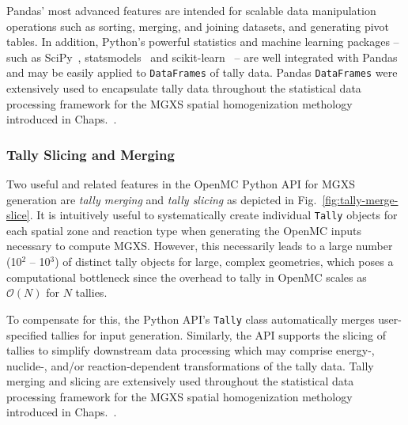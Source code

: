 Pandas' most advanced features are intended for scalable data manipulation operations such as sorting, merging, and joining datasets, and generating pivot tables. In addition, Python's powerful statistics and machine learning packages -- such as SciPy~\cite{jones2011scipy}, statsmodels~\cite{seabold2010statsmodels} and scikit-learn~\cite{pedregosa2011sklearn} -- are well integrated with Pandas and may be easily applied to \texttt{DataFrames} of tally data. Pandas \texttt{DataFrames} were extensively used to encapsulate tally data throughout the statistical data processing framework for the \ac{MGXS} spatial homogenization methology introduced in Chaps.~.

\subsubsection{Tally Slicing and Merging}
\label{subsubsec:chap4-tally-slice-merge}

Two useful and related features in the OpenMC Python \ac{API} for \ac{MGXS} generation are \textit{tally merging} and \textit{tally slicing} as depicted in Fig.~\ref{fig:tally-merge-slice}. It is intuitively useful to systematically create individual \texttt{Tally} objects for each spatial zone and reaction type when generating the OpenMC inputs necessary to compute \ac{MGXS}. However, this necessarily leads to a large number (10$^2$ -- 10$^3$) of distinct tally objects for large, complex geometries, which poses a computational bottleneck since the overhead to tally in OpenMC scales as $\mathcal{O}(N)$ for $N$ tallies. 

To compensate for this, the Python \ac{API}'s \texttt{Tally} class automatically merges user-specified tallies for input generation. Similarly, the \ac{API} supports the slicing of tallies to simplify downstream data processing which may comprise energy-, nuclide-, and/or reaction-dependent transformations of the tally data. Tally merging and slicing are extensively used throughout the statistical data processing framework for the \ac{MGXS} spatial homogenization methology introduced in Chaps.~.

